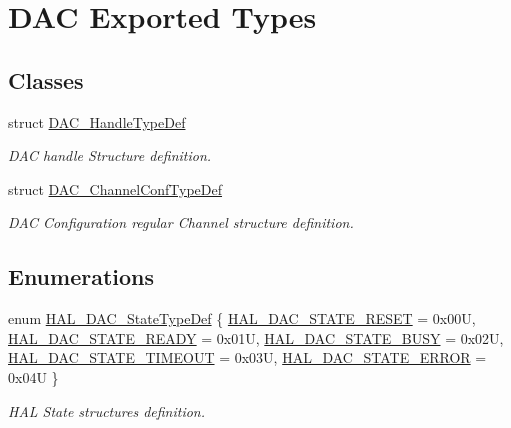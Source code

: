 \hypertarget{group___d_a_c___exported___types}{}\section{D\+AC Exported Types}
\label{group___d_a_c___exported___types}
\subsection*{Classes}
\begin{DoxyCompactItemize}
\item 
struct \mbox{\hyperlink{struct_d_a_c___handle_type_def}{D\+A\+C\+\_\+\+Handle\+Type\+Def}}
\begin{DoxyCompactList}\small\item\em D\+AC handle Structure definition. \end{DoxyCompactList}\item 
struct \mbox{\hyperlink{struct_d_a_c___channel_conf_type_def}{D\+A\+C\+\_\+\+Channel\+Conf\+Type\+Def}}
\begin{DoxyCompactList}\small\item\em D\+AC Configuration regular Channel structure definition. \end{DoxyCompactList}\end{DoxyCompactItemize}
\subsection*{Enumerations}
\begin{DoxyCompactItemize}
\item 
enum \mbox{\hyperlink{group___d_a_c___exported___types_ga4e917340aba1cc3afd4e9a7fef15e4a5}{H\+A\+L\+\_\+\+D\+A\+C\+\_\+\+State\+Type\+Def}} \{ \newline
\mbox{\hyperlink{group___d_a_c___exported___types_gga4e917340aba1cc3afd4e9a7fef15e4a5a225221a33734e3bfaf96837205e9284a}{H\+A\+L\+\_\+\+D\+A\+C\+\_\+\+S\+T\+A\+T\+E\+\_\+\+R\+E\+S\+ET}} = 0x00U, 
\mbox{\hyperlink{group___d_a_c___exported___types_gga4e917340aba1cc3afd4e9a7fef15e4a5a1aa309188f7914d5f784844845e2fea1}{H\+A\+L\+\_\+\+D\+A\+C\+\_\+\+S\+T\+A\+T\+E\+\_\+\+R\+E\+A\+DY}} = 0x01U, 
\mbox{\hyperlink{group___d_a_c___exported___types_gga4e917340aba1cc3afd4e9a7fef15e4a5affada80e942967574be53057d5605972}{H\+A\+L\+\_\+\+D\+A\+C\+\_\+\+S\+T\+A\+T\+E\+\_\+\+B\+U\+SY}} = 0x02U, 
\mbox{\hyperlink{group___d_a_c___exported___types_gga4e917340aba1cc3afd4e9a7fef15e4a5a3c2698f346b203536a01b437f52e4215}{H\+A\+L\+\_\+\+D\+A\+C\+\_\+\+S\+T\+A\+T\+E\+\_\+\+T\+I\+M\+E\+O\+UT}} = 0x03U, 
\newline
\mbox{\hyperlink{group___d_a_c___exported___types_gga4e917340aba1cc3afd4e9a7fef15e4a5a83347a132e56df40341053a475360d9f}{H\+A\+L\+\_\+\+D\+A\+C\+\_\+\+S\+T\+A\+T\+E\+\_\+\+E\+R\+R\+OR}} = 0x04U
 \}
\begin{DoxyCompactList}\small\item\em H\+AL State structures definition. \end{DoxyCompactList}\end{DoxyCompactItemize}


